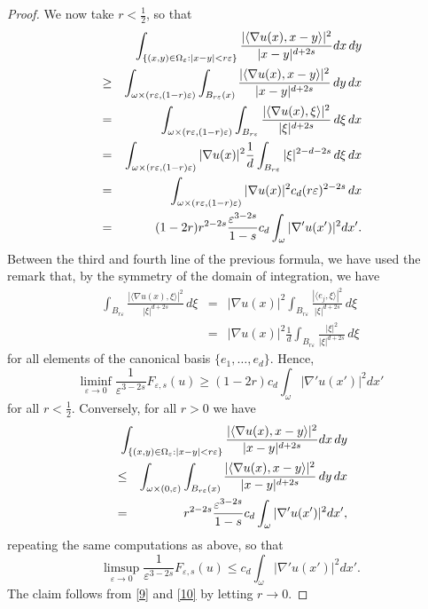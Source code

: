 \documentclass[10pt,a4paper]{amsart}
\newcommand{\e}{\varepsilon}
\begin{document}
\begin{proof}
We now take $r<\frac12$, so that 
\begin{eqnarray*}
&&\hskip-1cm\int_{\{(x,y)\in\Omega_\e: |x-y|<r\e\}}\frac{|\langle \nabla u(x), x-y\rangle|^2}{|x-y|^{d+2s}} dx\,dy\\
&\ge &\int_{\omega\times (r\e,(1-r)\e)}\int_{B_{r\e}(x)}\frac{|\langle \nabla u(x), x-y\rangle|^2}{|x-y|^{d+2s}}\,dy\,dx\\
&=&\int_{\omega\times (r\e,(1-r)\e)}\int_{B_{r\e}}\frac{|\langle \nabla u(x), \xi\rangle|^2}{|\xi|^{d+2s}}\,d\xi\,dx\\
&=&\int_{\omega\times (r\e,(1-r)\e)}|\nabla u(x)|^2\frac1d\int_{B_{r\e}}|\xi|^{2-d-2s}\,d\xi\,dx\\
&=&\int_{\omega\times (r\e,(1-r)\e)}|\nabla u(x)|^2c_d(r\e)^{2-2s}\,dx\\
&=&(1-2r)r^{2-2s}\frac{\e^{3-2s}}{1-s}c_d\int_{\omega}|\nabla' u(x')|^2dx'.
\end{eqnarray*}
Between the third and fourth line of the previous formula, we have used the remark that, by the symmetry of the domain of integration, we have 
\begin{eqnarray*}
\int_{B_{r\e}}\frac{|\langle \nabla u(x), \xi\rangle|^2}{|\xi|^{d+2s}}\,d\xi&=&|\nabla u(x)|^2 \int_{B_{r\e}}\frac{|\langle e_j, \xi\rangle|^2}{|\xi|^{d+2s}}\,d\xi\\
&=&|\nabla u(x)|^2 \frac1d\int_{B_{r\e}}\frac{|\xi|^2}{|\xi|^{d+2s}}\,d\xi
\end{eqnarray*}
for all elements of the canonical basis $\{e_1,\ldots, e_d\}$.
Hence,
\begin{equation}\label{9}
\liminf_{\e\to 0}\frac{1}{\e^{3-2s}}F_{\e,s}(u)\ge (1-2r)c_d\int_{\omega}|\nabla' u(x')|^2dx'
\end{equation}
for all $r<\frac12$. Conversely, for all $r>0$ we have
\begin{eqnarray}\label{a3}\nonumber
&&\hskip-1cm\int_{\{(x,y)\in\Omega_\e: |x-y|<r\e\}}\frac{|\langle \nabla u(x), x-y\rangle|^2}{|x-y|^{d+2s}} dx\,dy\\ \nonumber
&\le &\int_{\omega\times (0,\e)}\int_{B_{r\e}(x)}\frac{|\langle \nabla u(x), x-y\rangle|^2}{|x-y|^{d+2s}}\,dy\,dx
\\
&=&r^{2-2s}\frac{\e^{3-2s}}{1-s}c_d\int_{\omega}|\nabla' u(x')|^2dx',
\end{eqnarray}
repeating the same computations as above, so that 
\begin{equation}\label{10}
\limsup_{\e\to 0}\frac{1}{\e^{3-2s}}F_{\e,s}(u)\le c_d\int_{\omega}|\nabla' u(x')|^2dx'.
\end{equation}
The claim follows from \eqref{9} and \eqref{10} by letting $r\to 0$.
\end{proof}
\end{document}
